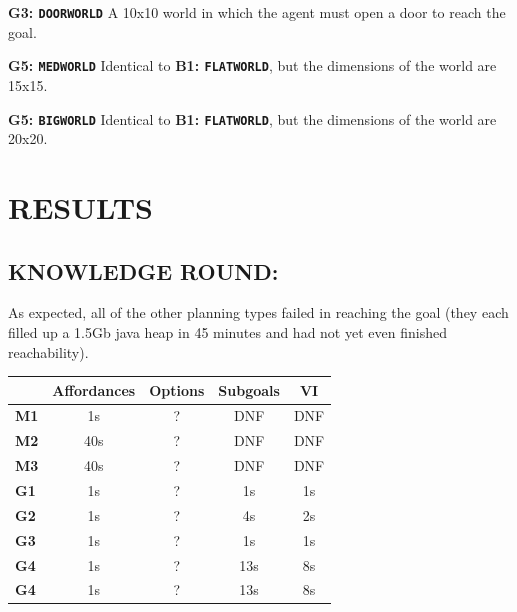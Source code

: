 \documentclass[]{article}
\begin{document}
{\bf G3: \texttt{DOORWORLD}} A 10x10 world in which the agent must open a door to reach the goal.



%




{\bf G5: \texttt{MEDWORLD}} Identical to {\bf B1: \texttt{FLATWORLD}}, but the dimensions of the world are 15x15.


{\bf G5: \texttt{BIGWORLD}} Identical to {\bf B1: \texttt{FLATWORLD}}, but the dimensions of the world are 20x20.



%

\section{RESULTS}

\subsection{KNOWLEDGE ROUND:}

As expected, all of the other planning types failed in reaching the goal (they each filled up a 1.5Gb java heap in 45 minutes and had not yet even finished reachability).

\begin{tabular}{ l || c | c | c | c }
  & Affordances & Options & Subgoals & VI \\
  \hline
  {\bf M1} & 1s & ? & DNF & DNF  \\
  {\bf M2} & 40s & ? & DNF & DNF \\
  {\bf M3} & 40s & ? & DNF & DNF \\
  {\bf G1} & 1s & ? & 1s & 1s \\
  {\bf G2} & 1s & ? & 4s & 2s \\
  {\bf G3} & 1s & ? & 1s & 1s \\
  {\bf G4} & 1s & ? & 13s & 8s \\
  {\bf G4} & 1s & ? & 13s & 8s \\
\end{tabular}
\end{document}

